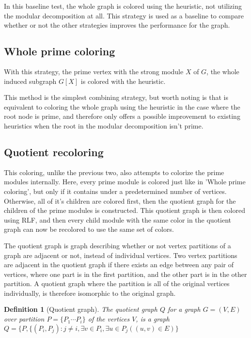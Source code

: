 \documentclass[a4paper]{article}
\newtheorem{definition}{Definition}[section]
\begin{document}
In this baseline test, the whole graph is colored using the heuristic, not
utilizing the modular decomposition at all. This strategy is used as a baseline
to compare whether or not the other strategies improves the performance for the
graph.

\subsection{Whole prime coloring}

With this strategy, the prime vertex with the strong module $X$ of $G$, the
whole induced subgraph $G[X]$ is colored with the heuristic.

This method is the simplest combining strategy, but worth noting is that is
equivalent to coloring the whole graph using the heuristic in the case where the
root node is prime, and therefore only offers a possible improvement to existing
heuristics when the root in the modular decomposition isn't prime.

\subsection{Quotient recoloring}

This coloring, unlike the previous two, also attempts to colorize the prime
modules internally. Here, every prime module is colored just like in 'Whole
prime coloring', but only if it contains under a predetermined number of
vertices. Otherwise, all of it's children are colored first, then the quotient
graph for the children of the prime modules is constructed. This quotient graph
is then colored using RLF, and then every child module with the same
color in the quotient graph can now be recolored to use the same set of colors.

The quotient graph is graph describing whether or not vertex partitions of a
graph are adjacent or not, instead of individual vertices. Two vertex
partitions are adjacent in the quotient graph if there exists an edge between
any pair of vertices, where one part is in the first partition, and the other
part is in the other partition. A quotient graph where the partition is all of
the original vertices individually, is therefore isomorphic to the original
graph.

\begin{definition}[Quotient graph]
    The quotient graph $Q$ for a graph $G = (V,E)$ over partition 
    $P = \{P_1 \cdots P_i\}$  of the vertices $V$, is a graph 
    $Q = \{P, \{(P_i,P_j) : j\neq i, \exists v \in P_i,\exists u \in P_j( (u,v)
    \in E)   \}   $
\end{definition}
\end{document}
